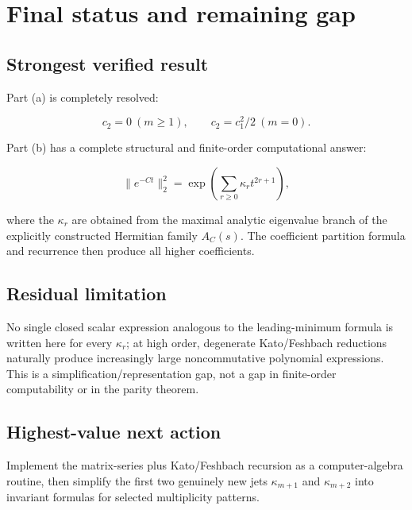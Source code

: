 \documentclass[11pt,a4paper]{article}
\begin{document}
\section{Final status and remaining gap}\label{final-status-and-remaining-gap}

\subsection{Strongest verified result}\label{strongest-verified-result}

Part (a) is completely resolved:

\[
\boxed{
 c_2=0\ (m\ge1),
 \qquad
 c_2=c_1^2/2\ (m=0).
}
\]

Part (b) has a complete structural and finite-order computational answer:

\[
\boxed{
 \|e^{-Ct}\|_2^2
 =\exp\!\left(\sum_{r\ge0}\kappa_rt^{2r+1}\right),
}
\]

where the \(\kappa_r\) are obtained from the maximal analytic eigenvalue branch of the explicitly constructed Hermitian family \(A_C(s)\). The coefficient partition formula and recurrence then produce all higher coefficients.

\subsection{Residual limitation}\label{residual-limitation}

No single closed scalar expression analogous to the leading-minimum formula is written here for every \(\kappa_r\); at high order, degenerate Kato/Feshbach reductions naturally produce increasingly large noncommutative polynomial expressions. This is a simplification/representation gap, not a gap in finite-order computability or in the parity theorem.

\subsection{Highest-value next action}\label{highest-value-next-action}

Implement the matrix-series plus Kato/Feshbach recursion as a computer-algebra routine, then simplify the first two genuinely new jets \(\kappa_{m+1}\) and \(\kappa_{m+2}\) into invariant formulas for selected multiplicity patterns.
\end{document}
